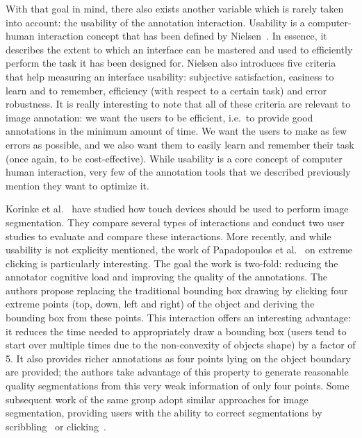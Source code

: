 With that goal in mind, there also exists another variable
which is rarely taken into account: the usability of the annotation interaction.
Usability is a computer-human interaction concept
that has been defined by Nielsen~\cite{nielsen1994usability}.
In essence, it describes the extent to which an interface
can be mastered and used to efficiently perform the task it has been designed for.
Nielsen also introduces five criteria that help measuring an interface usability:
subjective satisfaction, easiness to learn and to remember,
efficiency (with respect to a certain task) and error robustness.
It is really interesting to note that all of these criteria
are relevant to image annotation:
we want the users to be efficient, i.e.\ to provide good annotations
in the minimum amount of time.
We want the users to make as few errors as possible,
and we also want them to easily learn and remember their task
(once again, to be cost-effective).
While usability is a core concept of computer human interaction,
very few of the annotation tools that we described previously mention they want to optimize it.


Korinke et al.~\cite{korinke_intuitive_2015,korinke_exploring_2015}
have studied how touch devices should be used to perform image segmentation.
They compare several types of interactions and conduct
two user studies to evaluate and compare these interactions.
More recently, and while usability is not explicity mentioned,
the work of Papadopoulos et al.~\cite{papadopoulos2017extreme}
on extreme clicking is particularly interesting.
The goal the work is two-fold: reducing the annotator cognitive load
and improving the quality of the annotations.
The authors propose replacing the traditional bounding box drawing
by clicking four extreme points (top, down, left and right)
of the object and deriving the bounding box from these points.
This interaction offers an interesting advantage:
it reduces the time needed to appropriately draw a bounding box
(users tend to start over multiple times due to the non-convexity of objects shape) by a factor of 5.
It also provides richer annotations as four points lying on the object boundary are provided;
the authors take advantage of this property to generate reasonable quality segmentations
from this very weak information of only four points.
Some subsequent work of the same group adopt similar approaches for image segmentation,
providing users with the ability to correct segmentations
by scribbling~\cite{agustsson2018interactive} or clicking~\cite{OpenImagesSegmentation}.


